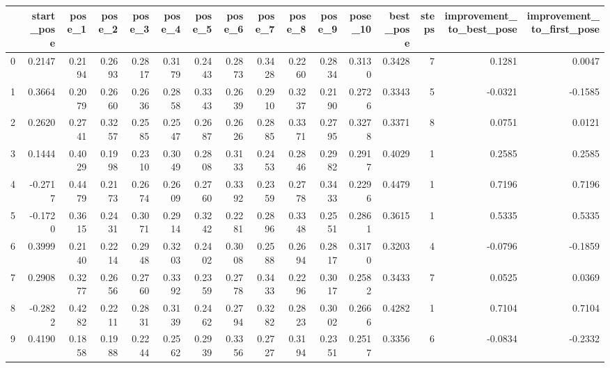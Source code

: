 \begin{tabular}{lrrrrrrrrrrrrrrr}
\toprule
{} &  start\_pose &  pose\_1 &  pose\_2 &  pose\_3 &  pose\_4 &  pose\_5 &  pose\_6 &  pose\_7 &  pose\_8 &  pose\_9 &  pose\_10 &  best\_pose &  steps &  improvement\_to\_best\_pose &  improvement\_to\_first\_pose \\
\midrule
0  &      0.2147 &  0.2194 &  0.2693 &  0.2817 &  0.3179 &  0.2443 &  0.2873 &  0.3428 &  0.2260 &  0.2834 &   0.3130 &     0.3428 &      7 &                    0.1281 &                     0.0047 \\
1  &      0.3664 &  0.2079 &  0.2660 &  0.2636 &  0.2858 &  0.3343 &  0.2639 &  0.2910 &  0.3237 &  0.2190 &   0.2726 &     0.3343 &      5 &                   -0.0321 &                    -0.1585 \\
2  &      0.2620 &  0.2741 &  0.3257 &  0.2585 &  0.2547 &  0.2687 &  0.2626 &  0.2885 &  0.3371 &  0.2795 &   0.3278 &     0.3371 &      8 &                    0.0751 &                     0.0121 \\
3  &      0.1444 &  0.4029 &  0.1998 &  0.2310 &  0.3049 &  0.2808 &  0.3133 &  0.2453 &  0.2846 &  0.2982 &   0.2917 &     0.4029 &      1 &                    0.2585 &                     0.2585 \\
4  &     -0.2717 &  0.4479 &  0.2173 &  0.2674 &  0.2609 &  0.2760 &  0.3392 &  0.2359 &  0.2778 &  0.3433 &   0.2296 &     0.4479 &      1 &                    0.7196 &                     0.7196 \\
5  &     -0.1720 &  0.3615 &  0.2431 &  0.3071 &  0.2914 &  0.3242 &  0.2281 &  0.2896 &  0.3348 &  0.2551 &   0.2861 &     0.3615 &      1 &                    0.5335 &                     0.5335 \\
6  &      0.3999 &  0.2140 &  0.2214 &  0.2948 &  0.3203 &  0.2402 &  0.3008 &  0.2588 &  0.2694 &  0.2817 &   0.3170 &     0.3203 &      4 &                   -0.0796 &                    -0.1859 \\
7  &      0.2908 &  0.3277 &  0.2656 &  0.2760 &  0.3392 &  0.2359 &  0.2778 &  0.3433 &  0.2296 &  0.3017 &   0.2582 &     0.3433 &      7 &                    0.0525 &                     0.0369 \\
8  &     -0.2822 &  0.4282 &  0.2211 &  0.2831 &  0.3139 &  0.2462 &  0.2794 &  0.3282 &  0.2823 &  0.3002 &   0.2666 &     0.4282 &      1 &                    0.7104 &                     0.7104 \\
9  &      0.4190 &  0.1858 &  0.1988 &  0.2244 &  0.2562 &  0.2939 &  0.3356 &  0.2727 &  0.3194 &  0.2351 &   0.2517 &     0.3356 &      6 &                   -0.0834 &                    -0.2332 \\

\end{tabular}
